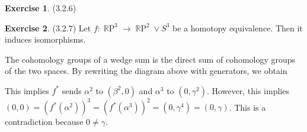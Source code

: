 \documentclass[12pt, psamsfonts]{amsart}
\theoremstyle{definition}
\newtheorem*{exer}{Exercise}
\theoremstyle{remark}
\DeclareMathOperator{\RP}{\mathbb{R}P}
\numberwithin{equation}{section}
\begin{document}
\begin{exer}{(3.2.6)}
\end{exer}

\begin{exer}{(3.2.7)}
  Let $f:\RP^3 \rightarrow \RP^2 \vee S^3$ be a homotopy equivalence.
  Then it induces isomorphisms.
  \begin{center}
  \end{center}

  The cohomology groups of a wedge sum is the direct sum of cohomology groups of the two spaces.
  By rewriting the diagram above with generators, we obtain
  \begin{center}
  \end{center}
  This implies $f^{\ast}$ sends $\alpha^2$ to $(\beta^2, 0)$ and $\alpha^3$ to $(0, \gamma^2)$.
  However, this implies $(0, 0) = (f^{\ast}(\alpha^2))^3 = (f^{\ast}(\alpha^3))^2 = (0, \gamma^4) = (0, \gamma)$.
  This is a contradiction because $0 \ne \gamma$.
\end{exer}
\end{document}
